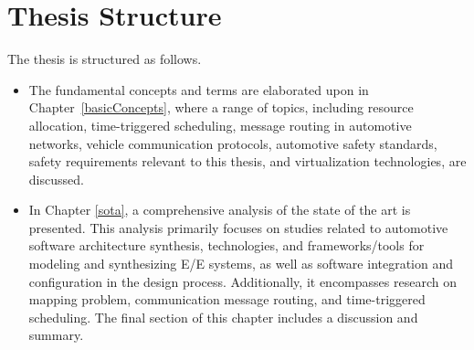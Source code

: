     
    

    
    \section{Thesis Structure}
    
    The thesis is structured as follows. 
    
    \begin{itemize}
        \item  %
        The fundamental concepts and terms are elaborated upon in Chapter~\ref{basicConcepts}, where a range of topics, including resource allocation, time-triggered scheduling, message routing in automotive networks, vehicle communication protocols, automotive safety standards, safety requirements relevant to this thesis, and virtualization technologies, are discussed.
        
        
        \item  %
       In Chapter \ref{sota}, a comprehensive analysis of the state of the art is presented. This analysis primarily focuses on studies related to automotive software architecture synthesis, technologies, and frameworks/tools for modeling and synthesizing E/E systems, as well as software integration and configuration in the design process. Additionally, it encompasses research on mapping problem, communication message routing, and time-triggered scheduling. The final section of this chapter includes a discussion and summary.
        

\end{itemize}
